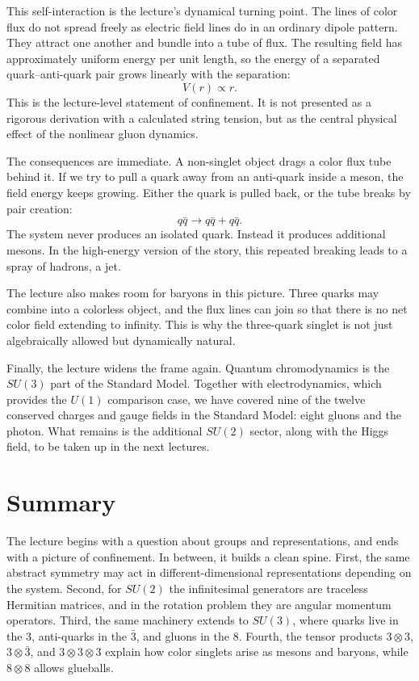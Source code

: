 This self-interaction is the lecture's dynamical turning point. The lines of color flux do not spread freely as electric field lines do in an ordinary dipole pattern. They attract one another and bundle into a tube of flux. The resulting field has approximately uniform energy per unit length, so the energy of a separated quark--anti-quark pair grows linearly with the separation:
\begin{equation}
V(r)\propto r.
\end{equation}
This is the lecture-level statement of confinement. It is not presented as a rigorous derivation with a calculated string tension, but as the central physical effect of the nonlinear gluon dynamics.

The consequences are immediate. A non-singlet object drags a color flux tube behind it. If we try to pull a quark away from an anti-quark inside a meson, the field energy keeps growing. Either the quark is pulled back, or the tube breaks by pair creation:
\begin{equation}
q\bar q \longrightarrow q\bar q + q\bar q.
\end{equation}
The system never produces an isolated quark. Instead it produces additional mesons. In the high-energy version of the story, this repeated breaking leads to a spray of hadrons, a jet.

The lecture also makes room for baryons in this picture. Three quarks may combine into a colorless object, and the flux lines can join so that there is no net color field extending to infinity. This is why the three-quark singlet is not just algebraically allowed but dynamically natural.

Finally, the lecture widens the frame again. Quantum chromodynamics is the \(SU(3)\) part of the Standard Model. Together with electrodynamics, which provides the \(U(1)\) comparison case, we have covered nine of the twelve conserved charges and gauge fields in the Standard Model: eight gluons and the photon. What remains is the additional \(SU(2)\) sector, along with the Higgs field, to be taken up in the next lectures.

\section{Summary}

The lecture begins with a question about groups and representations, and ends with a picture of confinement. In between, it builds a clean spine. First, the same abstract symmetry may act in different-dimensional representations depending on the system. Second, for \(SU(2)\) the infinitesimal generators are traceless Hermitian matrices, and in the rotation problem they are angular momentum operators. Third, the same machinery extends to \(SU(3)\), where quarks live in the \(3\), anti-quarks in the \(\bar 3\), and gluons in the \(8\). Fourth, the tensor products \(3\otimes3\), \(3\otimes\bar 3\), and \(3\otimes3\otimes3\) explain how color singlets arise as mesons and baryons, while \(8\otimes8\) allows glueballs.

